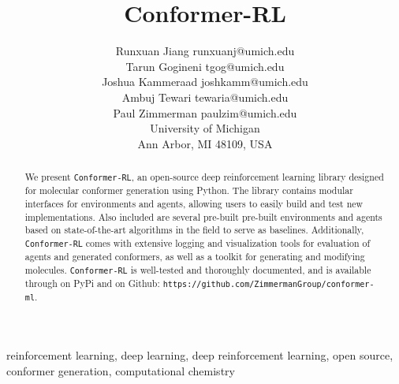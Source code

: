 \documentclass[twoside,11pt]{article}
\newcommand{\code}[1]{\texttt{#1}}
\newcommand{\titleofpaper}{Conformer-RL}
\begin{document}
\title{\titleofpaper}

\author{\name Runxuan Jiang \email runxuanj@umich.edu \\
       \name Tarun Gogineni \email tgog@umich.edu \\
       \name Joshua Kammeraad \email joshkamm@umich.edu\\
       \name Ambuj Tewari \email tewaria@umich.edu\\
       \name Paul Zimmerman \email paulzim@umich.edu\\
       \addr
       University of Michigan\\
       Ann Arbor, MI 48109, USA} 

\maketitle

\begin{abstract}%
  We present \code{\titleofpaper}, an open-source deep reinforcement learning library designed for molecular conformer generation using Python. The library contains modular interfaces for environments and agents, allowing users to easily build and test new implementations. Also included are several pre-built pre-built environments and agents based on state-of-the-art algorithms in the field to serve as baselines. Additionally, \code{\titleofpaper} comes with extensive logging and visualization tools for evaluation of agents and generated conformers, as well as a toolkit for generating and modifying molecules. \code{\titleofpaper} is well-tested and thoroughly documented, and is available through on PyPi and on Github: \code{https://github.com/ZimmermanGroup/conformer-ml}.
\end{abstract}

\begin{keywords}
  reinforcement learning, deep learning, deep reinforcement learning, open source, conformer generation, computational chemistry
\end{keywords}
\end{document}
